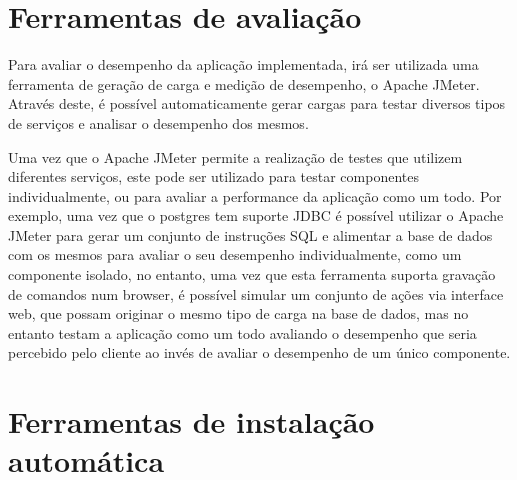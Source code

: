 \documentclass[12pt,a4paper]{article}
\begin{document}
\newpage
\section{Ferramentas de avaliação}

Para avaliar o desempenho da aplicação implementada, irá ser utilizada uma ferramenta de geração de carga e medição de desempenho, o Apache JMeter. Através deste, é possível automaticamente gerar cargas para testar diversos tipos de serviços e analisar o desempenho dos mesmos.


Uma vez que o Apache JMeter permite a realização de testes que utilizem diferentes serviços, este pode ser utilizado para testar componentes individualmente, ou para avaliar a performance da aplicação como um todo. Por exemplo, uma vez que o postgres tem suporte JDBC é possível utilizar o Apache JMeter para gerar um conjunto de instruções SQL e alimentar a base de dados com os mesmos para avaliar o seu desempenho individualmente, como um componente isolado, no entanto, uma vez que esta ferramenta suporta gravação de comandos num browser, é possível simular um conjunto de ações via interface web, que possam originar o mesmo tipo de carga na base de dados, mas no entanto testam a aplicação como um todo avaliando o desempenho que seria percebido pelo cliente ao invés de avaliar o desempenho de um único componente.




\newpage
\section{Ferramentas de instalação automática}



\newpage
\end{document}
